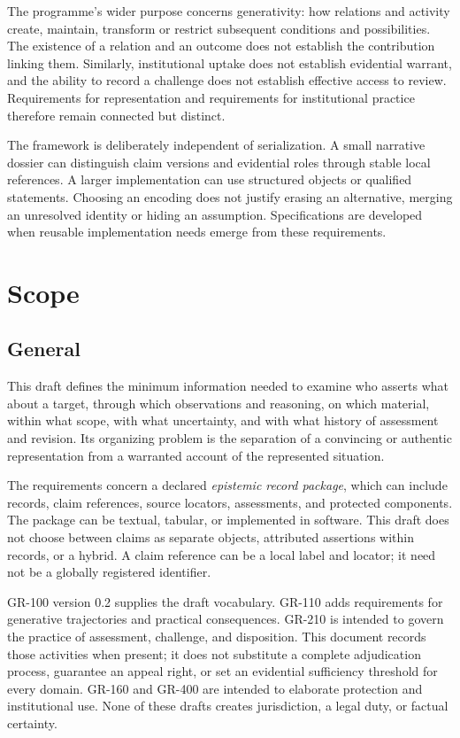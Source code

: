 \documentclass[11pt,a4paper]{article}
\begin{document}
The programme's wider purpose concerns generativity: how relations and activity create, maintain, transform or restrict subsequent conditions and possibilities. The existence of a relation and an outcome does not establish the contribution linking them. Similarly, institutional uptake does not establish evidential warrant, and the ability to record a challenge does not establish effective access to review. Requirements for representation and requirements for institutional practice therefore remain connected but distinct.

The framework is deliberately independent of serialization. A small narrative dossier can distinguish claim versions and evidential roles through stable local references. A larger implementation can use structured objects or qualified statements. Choosing an encoding does not justify erasing an alternative, merging an unresolved identity or hiding an assumption. Specifications are developed when reusable implementation needs emerge from these requirements.

\GSPmainmatter
\section{Scope}
\subsection{General}

This draft defines the minimum information needed to examine who asserts what about a target, through which observations and reasoning, on which material, within what scope, with what uncertainty, and with what history of assessment and revision. Its organizing problem is the separation of a convincing or authentic representation from a warranted account of the represented situation.

The requirements concern a declared \emph{epistemic record package}, which can include records, claim references, source locators, assessments, and protected components. The package can be textual, tabular, or implemented in software. This draft does not choose between claims as separate objects, attributed assertions within records, or a hybrid. A claim reference can be a local label and locator; it need not be a globally registered identifier.

GR-100 version 0.2 supplies the draft vocabulary. GR-110 adds requirements for generative trajectories and practical consequences. GR-210 is intended to govern the practice of assessment, challenge, and disposition. This document records those activities when present; it does not substitute a complete adjudication process, guarantee an appeal right, or set an evidential sufficiency threshold for every domain. GR-160 and GR-400 are intended to elaborate protection and institutional use. None of these drafts creates jurisdiction, a legal duty, or factual certainty.
\end{document}
